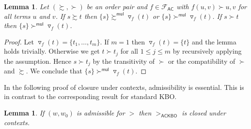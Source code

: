\documentclass{tlp}
\newtheorem{lemma}[theorem]{Lemma}
\newcommand{\tf}[1]{{\triangledown_{\!#1}}}
\newcommand{\m}[1]{\mathsf{#1}}
\newcommand{\mc}[1]{\mathcal{#1}}
\newcommand{\mr}[1]{\mathrm{#1}}
\newcommand{\mul}{\m{mul}}
\newcommand{\FF}{\mc{F}}
\newcommand{\AC}{\mr{\m{AC}}}
\newcommand{\ackbo}{\mr{\m{ACKBO}}}
\newcommand{\seq}[2][n]{{#2_1},\dots,{#2_{#1}}}
\newcommand{\GT}{\mathrel{\succ}}
\newcommand{\GS}{\mathrel{\succsim}}
\begin{document}
\begin{lemma}
\label{lem:tf}
Let $({\GS},{\GT})$ be an order pair and $f \in \FF_\AC$ with
$f(u,v) \GT u, v$ for all terms $u$ and $v$. If $s \GS t$ then
$\{ s \} \GS^\mul \tf{f}(t)$ or $\{ s \} \GT^\mul \tf{f}(t)$.
If $s \GT t$ then $\{ s \} \GT^\mul \tf{f}(t)$.
\end{lemma}

\begin{proof}
Let $\tf{f}(t) = \{ \seq[m]{t} \}$.
If $m = 1$ then $\tf{f}(t) = \{ t \}$ and the lemma holds trivially.
Otherwise we get $t \GT t_j$ for all $1 \leqslant j \leqslant m$ by
recursively applying the assumption. Hence $s \GT t_j$
by the transitivity of $\GT$ or the compatibility of $\GT$ and $\GS$.
We conclude that $\{ s \} \GT^\mul \tf{f}(t)$.
\end{proof}

In the following proof of closure under contexts, admissibility is
essential. This is in contrast to the corresponding result for
standard KBO.

\begin{lemma}
\label{lem:ackbo monotone}
If $(w,w_0)$ is admissible for $>$ then $>_\ackbo$ is closed under
contexts.
\end{lemma}
\end{document}
